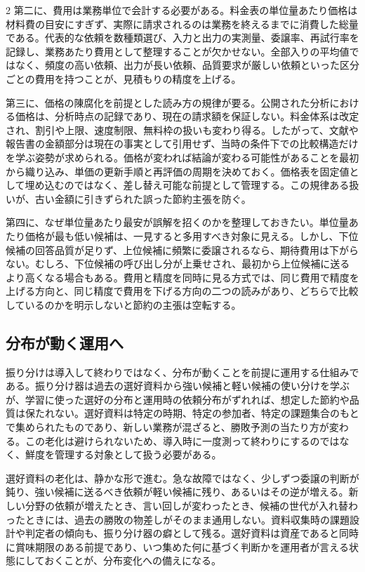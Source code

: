 \documentclass[lualatex,a4paper,10pt]{jlreq}
\begin{document}
\begin{multicols}{2}
第二に、費用は業務単位で会計する必要がある。料金表の単位量あたり価格は材料費の目安にすぎず、実際に請求されるのは業務を終えるまでに消費した総量である。代表的な依頼を数種類選び、入力と出力の実測量、委譲率、再試行率を記録し、業務あたり費用として整理することが欠かせない。全部入りの平均値ではなく、頻度の高い依頼、出力が長い依頼、品質要求が厳しい依頼といった区分ごとの費用を持つことが、見積もりの精度を上げる。

第三に、価格の陳腐化を前提とした読み方の規律が要る。公開された分析における価格は、分析時点の記録であり、現在の請求額を保証しない。料金体系は改定され、割引や上限、速度制限、無料枠の扱いも変わり得る。したがって、文献や報告書の金額部分は現在の事実として引用せず、当時の条件下での比較構造だけを学ぶ姿勢が求められる。価格が変われば結論が変わる可能性があることを最初から織り込み、単価の更新手順と再評価の周期を決めておく。価格表を固定値として埋め込むのではなく、差し替え可能な前提として管理する。この規律ある扱いが、古い金額に引きずられた誤った節約主張を防ぐ。

第四に、なぜ単位量あたり最安が誤解を招くのかを整理しておきたい。単位量あたり価格が最も低い候補は、一見すると多用すべき対象に見える。しかし、下位候補の回答品質が足りず、上位候補に頻繁に委譲されるなら、期待費用は下がらない。むしろ、下位候補の呼び出し分が上乗せされ、最初から上位候補に送るより高くなる場合もある。費用と精度を同時に見る方式では、同じ費用で精度を上げる方向と、同じ精度で費用を下げる方向の二つの読みがあり、どちらで比較しているのかを明示しないと節約の主張は空転する\autocite{frugalgpt}。

\subsection{分布が動く運用へ}
振り分けは導入して終わりではなく、分布が動くことを前提に運用する仕組みである。振り分け器は過去の選好資料から強い候補と軽い候補の使い分けを学ぶが、学習に使った選好の分布と運用時の依頼分布がずれれば、想定した節約や品質は保たれない。選好資料は特定の時期、特定の参加者、特定の課題集合のもとで集められたものであり、新しい業務が混ざると、勝敗予測の当たり方が変わる。この老化は避けられないため、導入時に一度測って終わりにするのではなく、鮮度を管理する対象として扱う必要がある\autocite{routellm}。

選好資料の老化は、静かな形で進む。急な故障ではなく、少しずつ委譲の判断が鈍り、強い候補に送るべき依頼が軽い候補に残り、あるいはその逆が増える。新しい分野の依頼が増えたとき、言い回しが変わったとき、候補の世代が入れ替わったときには、過去の勝敗の物差しがそのまま通用しない。資料収集時の課題設計や判定者の傾向も、振り分け器の癖として残る。選好資料は資産であると同時に賞味期限のある前提であり、いつ集めた何に基づく判断かを運用者が言える状態にしておくことが、分布変化への備えになる。


\end{multicols}
\end{document}
